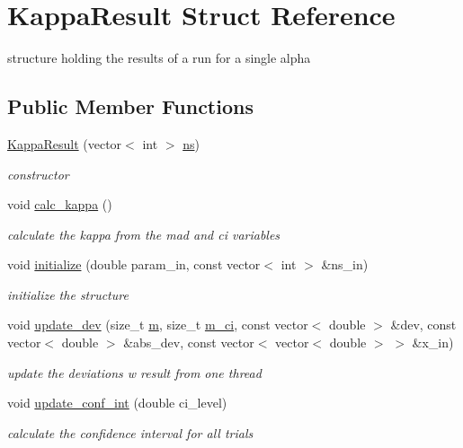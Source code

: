 \hypertarget{structKappaResult}{}\section{Kappa\+Result Struct Reference}
\label{structKappaResult}


structure holding the results of a run for a single alpha  


\subsection*{Public Member Functions}
\begin{DoxyCompactItemize}
\item 
\mbox{\hyperlink{structKappaResult_ac0ca82b62ef4f9717ab9e136b251668b}{Kappa\+Result}} (vector$<$ int $>$ \mbox{\hyperlink{structKappaResult_a48d379e6c356ee537839917a67a21c86}{ns}})
\begin{DoxyCompactList}\small\item\em constructor \end{DoxyCompactList}\item 
\mbox{\label{structKappaResult_a54228c60b4691f2b1621aa07b1e0437f}} 
void \mbox{\hyperlink{structKappaResult_a54228c60b4691f2b1621aa07b1e0437f}{calc\+\_\+kappa}} ()
\begin{DoxyCompactList}\small\item\em calculate the kappa from the mad and ci variables \end{DoxyCompactList}\item 
void \mbox{\hyperlink{structKappaResult_a73d7fdfa72149f5ec74b22a203f418b9}{initialize}} (double param\+\_\+in, const vector$<$ int $>$ \&ns\+\_\+in)
\begin{DoxyCompactList}\small\item\em initialize the structure \end{DoxyCompactList}\item 
void \mbox{\hyperlink{structKappaResult_ad9a40b7ecb6f56e1e868fd559e07026f}{update\+\_\+dev}} (size\+\_\+t \mbox{\hyperlink{structKappaResult_a5d2264180cefdfefd364065aaf405b72}{m}}, size\+\_\+t \mbox{\hyperlink{structKappaResult_a59f858c0abe9db0eebd82a56665b38df}{m\+\_\+ci}}, const vector$<$ double $>$ \&dev, const vector$<$ double $>$ \&abs\+\_\+dev, const vector$<$ vector$<$ double $>$ $>$ \&x\+\_\+in)
\begin{DoxyCompactList}\small\item\em update the deviations w result from one thread \end{DoxyCompactList}\item 
void \mbox{\hyperlink{structKappaResult_a8dd8b127d34165637298435377489cff}{update\+\_\+conf\+\_\+int}} (double ci\+\_\+level)
\begin{DoxyCompactList}\small\item\em calculate the confidence interval for all trials \end{DoxyCompactList}\end{DoxyCompactItemize}
